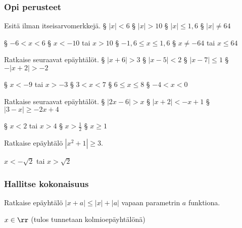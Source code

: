 \begin{tehtavasivu}

\subsubsection*{Opi perusteet}

\begin{tehtava}
Esitä ilman itseisarvomerkkejä.
	\alakohdat
		§ $|x|<6$
		§ $|x|>10$
		§ $|x|\leq 1,6$
		§ $|x|\neq 64$
	\loppu
	\begin{vastaus}
		\alakohdat
			§ $-6<x<6$
			§ $x<-10$ tai $x>10$
			§ $-1,6\leq x\leq 1,6$
			§ $x\neq -64$ tai $x\leq 64$
		\loppu
	\end{vastaus}
\end{tehtava}

\begin{tehtava}
Ratkaise seuraavat epäyhtälöt.
	\alakohdat
		§ $|x+6|>3$
		§ $|x-5|<2$
		§ $|x-7|\leq 1$
		§ $-|x+2|> -2$
	\loppu
	\begin{vastaus}
		\alakohdat
			§ $x<-9$ tai $x>-3$
			§ $3<x<7$
			§ $6\leq x\leq 8$
			§ $-4 < x < 0$
		\loppu
	\end{vastaus}
\end{tehtava}

\begin{tehtava}
Ratkaise seuraavat epäyhtälöt.
	\alakohdat
		§ $|2x-6|>x$
		§ $|x+2|<-x+1$
		§ $|3-x|\geq -2x+4$
	\loppu
	\begin{vastaus}
		\alakohdat
			§ $x<2$ tai $x>4$
			§ $x>\frac{1}{2}$
			§ $x\geq 1$
		\loppu
	\end{vastaus}
\end{tehtava}

\begin{tehtava}
	Ratkaise epäyhtälö $|x^2+1| \ge 3$.
	\begin{vastaus}
		$x<-\sqrt{2}$ tai $x>\sqrt{2}$
	\end{vastaus}
\end{tehtava}

\subsubsection*{Hallitse kokonaisuus}

\begin{tehtava}
	Ratkaise epäyhtälö $|x+a| \leq |x|+|a|$ vapaan parametrin $a$ funktiona.
	\begin{vastaus}
		$x \in \rr$ (tulos tunnetaan kolmioepäyhtälönä)
	\end{vastaus}
\end{tehtava}


\end{tehtavasivu}
